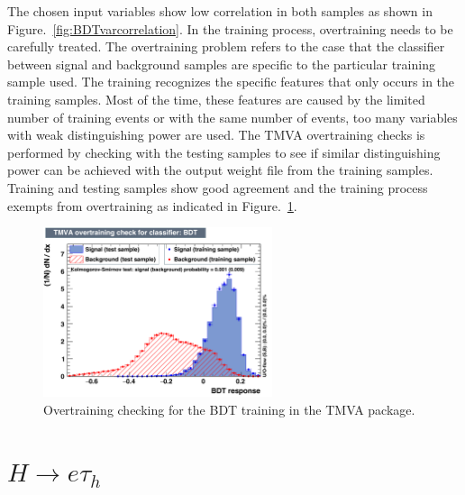 The chosen input variables show low correlation in both samples as shown in Figure.~\ref{fig:BDTvarcorrelation}. In the training process, overtraining needs to be carefully treated. The overtraining problem refers to the case that the classifier between signal and background samples are specific to the particular training sample used. The training recognizes the specific features that only occurs in the training samples. Most of the time, these features are caused by the limited number of training events or with the same number of events, too many variables with weak distinguishing power are used. The TMVA overtraining checks is performed by checking with the testing samples to see if similar distinguishing power can be achieved with the output weight file from the training samples. Training and testing samples show good agreement and the training process exempts from overtraining as indicated in Figure.~\ref{fig:BDTovertraining}.
\begin{figure}[htbp] 
\centering
\includegraphics[width=0.6\textwidth]{chapter5/overtrain_BDT.pdf}
\caption{Overtraining checking for the BDT training in the TMVA package.}
\label{fig:BDTovertraining}
\end{figure}

\section{\texorpdfstring{$H\rightarrow e \tau_h$}{Lg}}

